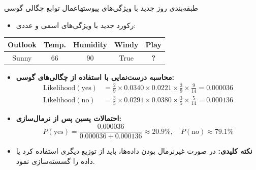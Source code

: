 \begin{frame}{طبقه‌بندی روز جدید با ویژگی‌های پیوسته}{اعمال توابع چگالی گوسی}
  \begin{itemize}
    \item رکورد جدید با ویژگی‌های اسمی و عددی:
  \end{itemize}
  \vspace{-0.1cm}
  \begin{center}
    \small
    \begin{latin}
    \begin{tabular}{|c|c|c|c|c|}
      \hline
      \textbf{Outlook} & \textbf{Temp.} & \textbf{Humidity} & \textbf{Windy} & \textbf{Play} \\
      \hline
      Sunny & 66 & 90 & True & \textbf{?} \\
      \hline
    \end{tabular}
    \end{latin}
  \end{center}
  \vspace{0.1cm}
  \begin{itemize}
    \item \textbf{محاسبه درست‌نمایی با استفاده از چگالی‌های گوسی:}
    \begin{align*}
      \text{Likelihood}(\text{yes}) &= \frac{2}{9} \times 0.0340 \times 0.0221 \times \frac{3}{9} \times \frac{9}{14} = 0.000036 \\[3pt]
      \text{Likelihood}(\text{no})  &= \frac{3}{5} \times 0.0291 \times 0.0380 \times \frac{3}{5} \times \frac{5}{14} = 0.000136
    \end{align*}
    \item \textbf{احتمالات پسین پس از نرمال‌سازی:}
    \[
      P(\text{yes}) = \frac{0.000036}{0.000036 + 0.000136} \approx 20.9\%, \quad P(\text{no}) \approx 79.1\%
    \]
    \item \textbf{نکته کلیدی:} در صورت غیرنرمال بودن داده‌ها، باید از توزیع دیگری استفاده کرد یا داده را گسسته‌سازی نمود.
  \end{itemize}
\end{frame}

